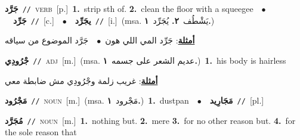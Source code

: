 \documentclass[10pt,a4paper,twoside]{article} %
\begin{document}
\begin{multicols}{2}
{\setlength\topsep{0pt}\textbf{\foreignlanguage{arabic}{جَرَّد}}\ {\color{gray}\texttt{//}\color{black}}\ \textsc{verb}\ [p.]\ \textbf{1.}~strip sth of.  \textbf{2.}~clean the floor with a squeegee\ \ $\bullet$\ \ \setlength\topsep{0pt}\textbf{\foreignlanguage{arabic}{جَرِّد}}\ {\color{gray}\texttt{//}\color{black}}\ [c.]\ \ $\bullet$\ \ \setlength\topsep{0pt}\textbf{\foreignlanguage{arabic}{يجَرِّد}}\ {\color{gray}\texttt{//}\color{black}}\ [i.]\ \color{gray}(msa. \foreignlanguage{arabic}{يَشْطُف}~\foreignlanguage{arabic}{\textbf{٢.}}  \foreignlanguage{arabic}{يُجَرِّد}~\foreignlanguage{arabic}{\textbf{١.}})\color{black}\  \begin{flushright}\color{gray}\foreignlanguage{arabic}{\textbf{\underline{\foreignlanguage{arabic}{أمثلة}}}: جَرِّد المي اللي هون\ $\bullet$\ \  جَرَّد الموضوع من سياقه}\end{flushright}\color{black}} \vspace{2mm}

{\setlength\topsep{0pt}\textbf{\foreignlanguage{arabic}{جْرُودِي}}\ {\color{gray}\texttt{//}\color{black}}\ \textsc{adj}\ [m.]\ \color{gray}(msa. \foreignlanguage{arabic}{عديم الشعر على جسمه}~\foreignlanguage{arabic}{\textbf{١.}})\color{black}\ \textbf{1.}~his body is hairless\  \begin{flushright}\color{gray}\foreignlanguage{arabic}{\textbf{\underline{\foreignlanguage{arabic}{أمثلة}}}: غريب زلمة وجْرُودِي  مش ضابطة معي}\end{flushright}\color{black}} \vspace{2mm}

{\setlength\topsep{0pt}\textbf{\foreignlanguage{arabic}{مَجْرُود}}\ {\color{gray}\texttt{//}\color{black}}\ \textsc{noun}\ [m.]\ \color{gray}(msa. \foreignlanguage{arabic}{مَجْرود}~\foreignlanguage{arabic}{\textbf{١.}})\color{black}\ \textbf{1.}~dustpan\ \ $\bullet$\ \ \setlength\topsep{0pt}\textbf{\foreignlanguage{arabic}{مَجَارِيد}}\ {\color{gray}\texttt{//}\color{black}}\ [pl.]\ } \vspace{2mm}

{\setlength\topsep{0pt}\textbf{\foreignlanguage{arabic}{مُجَرَّد}}\ {\color{gray}\texttt{//}\color{black}}\ \textsc{noun}\ [m.]\ \textbf{1.}~nothing but.  \textbf{2.}~mere  \textbf{3.}~for no other reason but.  \textbf{4.}~for the sole reason that\ } \vspace{2mm}


\end{multicols}
\end{document}

